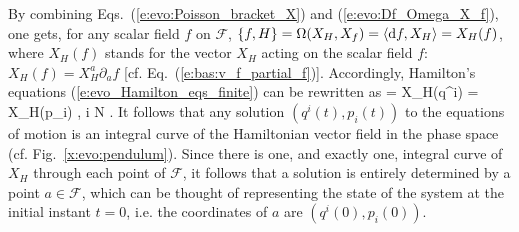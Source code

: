 By combining Eqs.~(\ref{e:evo:Poisson_bracket_X}) and (\ref{e:evo:Df_Omega_X_f}), one
gets, for any scalar field $f$ on $\mathcal{F}$,
$\{f,H\} = \Omega(X_H,X_f) = \langle\mathrm{d} f,X_H\rangle = X_H(f)$, where $X_H(f)$
stands for the vector $X_H$ acting on the scalar field $f$:  $X_H(f) = X_H^a \partial_a f$
[cf. Eq.~(\ref{e:bas:v_f_partial_f})]. Accordingly, Hamilton's equations (\ref{e:evo_Hamilton_eqs_finite}) can be rewritten as
\be \label{e:evo_Hamilton_eqs_X_H}
     = X_H(q^i) \qand {} = X_H(p_i) ,  \leq i \leq N .
\ee
It follows that any solution $(q^i(t),p_i(t))$ to the equations of motion is an
integral curve of the Hamiltonian vector field in the phase space
(cf. Fig.~\ref{x:evo:pendulum}). Since there is one, and exactly one,
integral curve of $X_H$ through each point of $\mathcal{F}$, it follows
that a solution is entirely determined by a point $a\in\mathcal{F}$,
which can be thought of representing the state of the system at the initial
instant $t=0$, i.e. the coordinates of $a$ are $(q^i(0),p_i(0))$.












